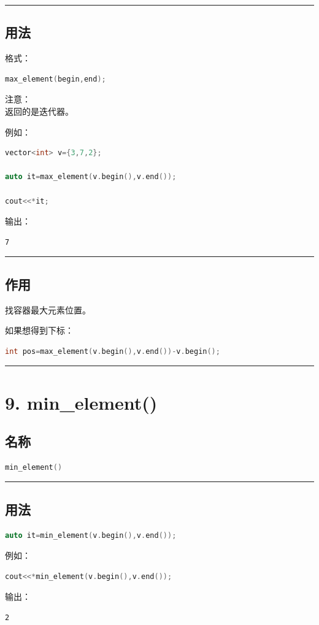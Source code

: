 \documentclass[9pt,twocolumn]{extarticle}
\begin{document}
\noindent\rule{\linewidth}{0.4pt}

\subsection{用法}
格式：
\begin{lstlisting}[language=C++]
max_element(begin,end);
\end{lstlisting}
注意：\\
返回的是迭代器。

例如：
\begin{lstlisting}[language=C++]
vector<int> v={3,7,2};

auto it=max_element(v.begin(),v.end());

cout<<*it;
\end{lstlisting}
输出：
\begin{lstlisting}
7
\end{lstlisting}

\noindent\rule{\linewidth}{0.4pt}

\subsection{作用}
找容器最大元素位置。

如果想得到下标：
\begin{lstlisting}[language=C++]
int pos=max_element(v.begin(),v.end())-v.begin();
\end{lstlisting}

\noindent\rule{\linewidth}{0.4pt}

\section{9. min\_element()}

\subsection{名称}
\begin{lstlisting}[language=C++]
min_element()
\end{lstlisting}

\noindent\rule{\linewidth}{0.4pt}

\subsection{用法}
\begin{lstlisting}[language=C++]
auto it=min_element(v.begin(),v.end());
\end{lstlisting}
例如：
\begin{lstlisting}[language=C++]
cout<<*min_element(v.begin(),v.end());
\end{lstlisting}
输出：
\begin{lstlisting}
2
\end{lstlisting}
\end{document}

